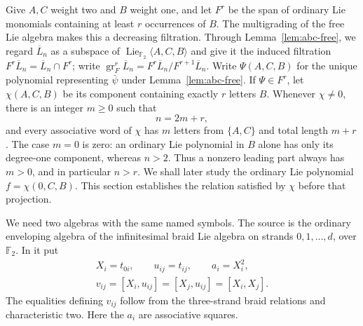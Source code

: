 \documentclass[11pt]{article}
\newcommand{\F}{{\mathbb F_2}}
\newcommand{\Lie}{\operatorname{Lie}}
\theoremstyle{definition}
\theoremstyle{remark}
\numberwithin{equation}{section}
\begin{document}
Give $A,C$ weight two and $B$ weight one, and let $F^r$ be the span of
ordinary Lie monomials containing at least $r$ occurrences of $B$.
The multigrading of the free Lie algebra makes this a decreasing
filtration.  Through Lemma~\ref{lem:abc-free}, we regard
$\overline L_n$ as a subspace of
$\Lie_{\F}\langle A,C,B\rangle$ and give it the induced filtration
$F^r\overline L_n=\overline L_n\cap F^r$; write
$\operatorname{gr}^r_F\overline L_n=
F^r\overline L_n/F^{r+1}\overline L_n$.
Write $\Psi(A,C,B)$ for the unique polynomial representing
$\bar\psi$ under Lemma~\ref{lem:abc-free}.  If $\Psi\in F^r$, let
$\chi(A,C,B)$ be its component containing exactly $r$ letters $B$.
Whenever $\chi\ne0$, there is an integer $m\geq0$ such that
\begin{equation}\label{eq:leading-count-weight}
 n=2m+r,
\end{equation}
and every associative word of $\chi$ has $m$ letters from $\{A,C\}$
and total length $m+r$.  The case $m=0$ is zero: an ordinary Lie
polynomial in $B$ alone has only its degree-one component, whereas
$n>2$.  Thus a nonzero leading part always has $m>0$, and in particular
$n>r$.  We shall later study the ordinary Lie polynomial
$f=\chi(0,C,B)$.  This section establishes the relation satisfied by
$\chi$ before that projection.

We need two algebras with the same named symbols.  The source is the
ordinary enveloping algebra of the infinitesimal braid Lie algebra
on strands $0,1,\ldots,d$, over $\F$.  In it put
\begin{equation}\label{eq:source-symbols}
\begin{gathered}
 X_i=t_{0i},\qquad u_{ij}=t_{ij},\qquad
 a_i=X_i^2,\\
 v_{ij}=[X_i,u_{ij}]=[X_j,u_{ij}]=[X_i,X_j].
\end{gathered}
\end{equation}
The equalities defining $v_{ij}$ follow from the three-strand braid
relations and characteristic two.  Here the $a_i$ are associative
squares.
\end{document}
